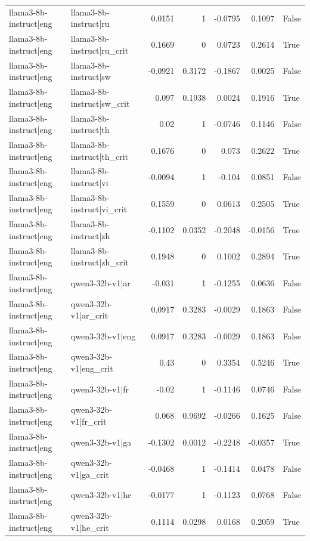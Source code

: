 \begin{table}
\begin{tabular}{l l r r r r l}
llama3-8b-instruct|eng & llama3-8b-instruct|ru & 0.0151 & 1 & -0.0795 & 0.1097 & False \\
llama3-8b-instruct|eng & llama3-8b-instruct|ru_crit & 0.1669 & 0 & 0.0723 & 0.2614 & True \\
llama3-8b-instruct|eng & llama3-8b-instruct|sw & -0.0921 & 0.3172 & -0.1867 & 0.0025 & False \\
llama3-8b-instruct|eng & llama3-8b-instruct|sw_crit & 0.097 & 0.1938 & 0.0024 & 0.1916 & True \\
llama3-8b-instruct|eng & llama3-8b-instruct|th & 0.02 & 1 & -0.0746 & 0.1146 & False \\
llama3-8b-instruct|eng & llama3-8b-instruct|th_crit & 0.1676 & 0 & 0.073 & 0.2622 & True \\
llama3-8b-instruct|eng & llama3-8b-instruct|vi & -0.0094 & 1 & -0.104 & 0.0851 & False \\
llama3-8b-instruct|eng & llama3-8b-instruct|vi_crit & 0.1559 & 0 & 0.0613 & 0.2505 & True \\
llama3-8b-instruct|eng & llama3-8b-instruct|zh & -0.1102 & 0.0352 & -0.2048 & -0.0156 & True \\
llama3-8b-instruct|eng & llama3-8b-instruct|zh_crit & 0.1948 & 0 & 0.1002 & 0.2894 & True \\
llama3-8b-instruct|eng & qwen3-32b-v1|ar & -0.031 & 1 & -0.1255 & 0.0636 & False \\
llama3-8b-instruct|eng & qwen3-32b-v1|ar_crit & 0.0917 & 0.3283 & -0.0029 & 0.1863 & False \\
llama3-8b-instruct|eng & qwen3-32b-v1|eng & 0.0917 & 0.3283 & -0.0029 & 0.1863 & False \\
llama3-8b-instruct|eng & qwen3-32b-v1|eng_crit & 0.43 & 0 & 0.3354 & 0.5246 & True \\
llama3-8b-instruct|eng & qwen3-32b-v1|fr & -0.02 & 1 & -0.1146 & 0.0746 & False \\
llama3-8b-instruct|eng & qwen3-32b-v1|fr_crit & 0.068 & 0.9692 & -0.0266 & 0.1625 & False \\
llama3-8b-instruct|eng & qwen3-32b-v1|ga & -0.1302 & 0.0012 & -0.2248 & -0.0357 & True \\
llama3-8b-instruct|eng & qwen3-32b-v1|ga_crit & -0.0468 & 1 & -0.1414 & 0.0478 & False \\
llama3-8b-instruct|eng & qwen3-32b-v1|he & -0.0177 & 1 & -0.1123 & 0.0768 & False \\
llama3-8b-instruct|eng & qwen3-32b-v1|he_crit & 0.1114 & 0.0298 & 0.0168 & 0.2059 & True \\

\end{tabular}
\end{table}

